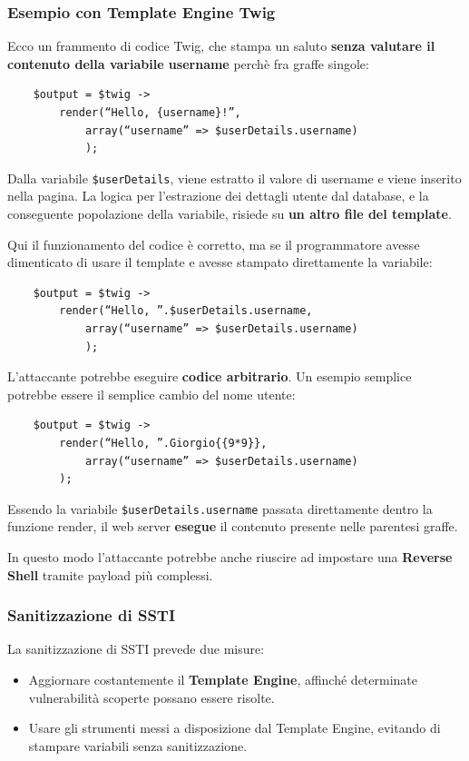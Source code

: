 \documentclass{article}
\begin{document}
\subsubsection{Esempio con Template Engine Twig}
Ecco un frammento di codice Twig, che stampa un saluto \textbf{senza valutare il contenuto della variabile username} perchè fra graffe singole:
\begin{verbatim}
	$output = $twig ->
		render(“Hello, {username}!”,
			array(“username” => $userDetails.username)
			);
\end{verbatim}

Dalla variabile \verb|$userDetails|, viene estratto il valore di username e viene inserito nella pagina. La logica per l’estrazione dei dettagli utente dal database, e la conseguente popolazione della variabile, risiede su \textbf{un altro file del template}.

Qui il funzionamento del codice è corretto, ma se il programmatore avesse dimenticato di usare il template e avesse stampato direttamente la variabile:
\begin{verbatim}
	$output = $twig ->
		render(“Hello, ”.$userDetails.username,
			array(“username” => $userDetails.username)
			);
\end{verbatim}

L'attaccante potrebbe eseguire \textbf{codice arbitrario}. Un esempio semplice potrebbe essere il semplice cambio del nome utente:
\begin{verbatim}
	$output = $twig ->
		render(“Hello, ”.Giorgio{{9*9}},
			array(“username” => $userDetails.username)
		);
\end{verbatim}

Essendo la variabile \verb|$userDetails.username| passata direttamente dentro la funzione render, il web server \textbf{esegue} il contenuto presente nelle parentesi graffe.

In questo modo l'attaccante potrebbe anche riuscire ad impostare una \textbf{Reverse Shell} tramite payload più complessi.

\subsubsection{Sanitizzazione di SSTI}
La sanitizzazione di SSTI prevede due misure:
\begin{itemize}
	\item Aggiornare costantemente il \textbf{Template Engine}, affinché determinate vulnerabilità scoperte possano essere risolte.
	\item Usare gli strumenti messi a disposizione dal Template Engine, evitando di stampare variabili senza sanitizzazione.
\end{itemize}
\end{document}
